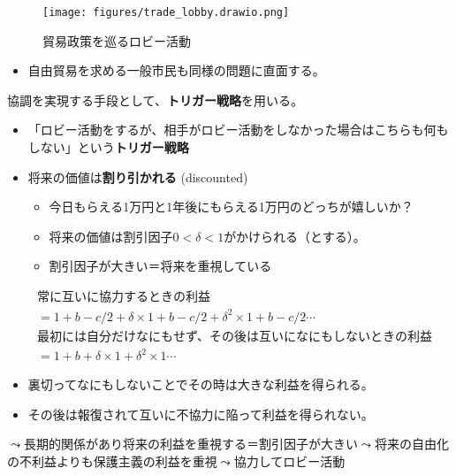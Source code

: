 \documentclass[
  xelatex,
  ja=standard]{bxjsarticle}
\providecommand{\tightlist}{%
  \setlength{\itemsep}{0pt}\setlength{\parskip}{0pt}}\usepackage{longtable,booktabs,array}
\begin{document}
\begin{figure}[htpb]

{\centering \texttt{[image: figures/trade\_lobby.drawio.png]}

}

\caption{貿易政策を巡るロビー活動}

\end{figure}

\begin{itemize}
\tightlist
\item
  自由貿易を求める一般市民も同様の問題に直面する。
\end{itemize}

協調を実現する手段として、\textbf{トリガー戦略}を用いる。

\begin{itemize}
\tightlist
\item
  「ロビー活動をするが、相手がロビー活動をしなかった場合はこちらも何もしない」という\textbf{トリガー戦略}
\item
  将来の価値は\textbf{割り引かれる} (discounted)

  \begin{itemize}
  \tightlist
  \item
    今日もらえる1万円と1年後にもらえる1万円のどっちが嬉しいか？
  \item
    将来の価値は割引因子\(0 < \delta < 1\)がかけられる（とする）。
  \item
    割引因子が大きい＝将来を重視している
  \end{itemize}
\end{itemize}

\[
\begin{split}
&\textrm{常に互いに協力するときの利益} \\
&= 1+b-c/2 + \delta \times 1+b-c/2 + \delta^2 \times 1+b-c/2 \cdots \\
&\textrm{最初には自分だけなにもせず、その後は互いになにもしないときの利益} \\
&= 1+b + \delta \times 1 + \delta^2 \times 1 \cdots
\end{split}
\]

\begin{itemize}
\tightlist
\item
  裏切ってなにもしないことでその時は大きな利益を得られる。
\item
  その後は報復されて互いに不協力に陥って利益を得られない。
\end{itemize}

\(\leadsto\)長期的関係があり将来の利益を重視する＝割引因子が大きい\(\leadsto\)将来の自由化の不利益よりも保護主義の利益を重視\(\leadsto\)協力してロビー活動
\end{document}
